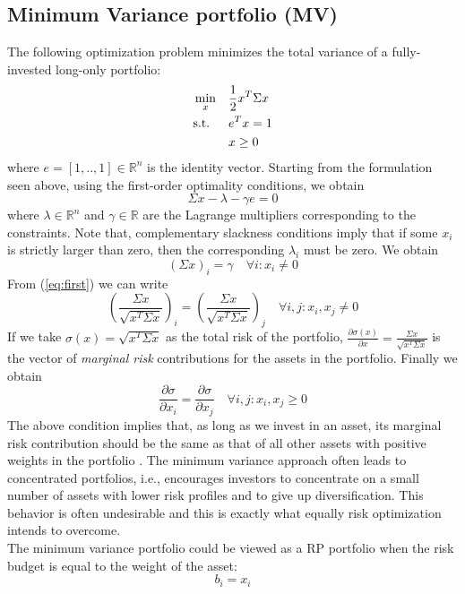 \subsection{Minimum Variance portfolio (MV)}
The following optimization problem minimizes the total variance of a fully-invested long-only portfolio:
\begin{equation}
\begin{aligned}
& \min_x
&& \frac{1}{2}x^T \Sigma x\vspace{-0.8em}\\
&\text{s.t.}
&&e^T x =1\\
&&&x \geq 0
\end{aligned}
\end{equation}
where $e = [1, .., 1] \in \mathbb{R}^n$ is the identity vector. Starting from the formulation seen above, using the first-order optimality conditions, we obtain
\begin{equation}
\Sigma x - \lambda - \gamma e = 0
\end{equation}
where $\lambda \in \mathbb{R}^n$ and $\gamma \in \mathbb{R}$ are the Lagrange multipliers corresponding to the constraints. Note that, complementary slackness conditions imply that if some $x_i$ is strictly larger than zero, then the corresponding $\lambda_i$ must be zero. We obtain
\begin{equation}\label{eq:first}
(\Sigma x)_i = \gamma \quad \forall i: x_i \neq 0
\end{equation}
From (\ref{eq:first}) we can write
\begin{equation}
\left(\frac{\Sigma x}{\sqrt{x^T \Sigma x}}\right)_i = \left(\frac{\Sigma x}{\sqrt{x^T \Sigma x}}\right)_j \quad \forall i,j: x_i,x_j \neq 0 
\end{equation}
If we take $\sigma (x) = \sqrt{x^T \Sigma x}$ as the total risk of the portfolio, $\frac{\partial\sigma (x)}{\partial x} = \frac{\Sigma x}{\sqrt{x^T \Sigma x}}$ is the vector of \textit{marginal risk} contributions for the assets in the portfolio. Finally we obtain
\begin{equation}\label{eq:erc1}
\frac{\partial\sigma}{\partial x_i} = \frac{\partial\sigma}{\partial x_j}\quad \forall i,j: x_i,x_j \geq 0
\end{equation}
The above condition implies that, as long as we invest in an asset, its marginal risk contribution should be the same as that of all other assets with positive weights in the portfolio \cite{tutuncu}. The minimum variance approach often leads to concentrated portfolios, i.e., encourages investors to concentrate on a small number of assets with lower risk profiles and to give up diversification. This behavior is often undesirable and this is exactly what equally risk optimization intends to overcome.\\
The minimum variance portfolio could be viewed as a RP portfolio when the risk budget is equal to the weight of the asset\footnotemark[2]:
\begin{equation*}
b_i = x_i
\end{equation*}

